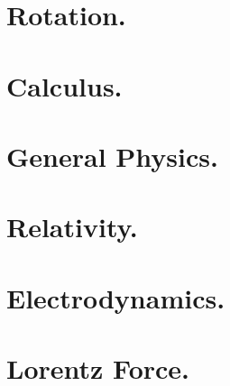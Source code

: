 \documentclass[12pt,leqno]{book}
\begin{document}
\part{Rotation.}








\part{Calculus.}










\part{General Physics.}











\part{Relativity.}








\part{Electrodynamics.}























\part{Lorentz Force.}


%



\end{document}
